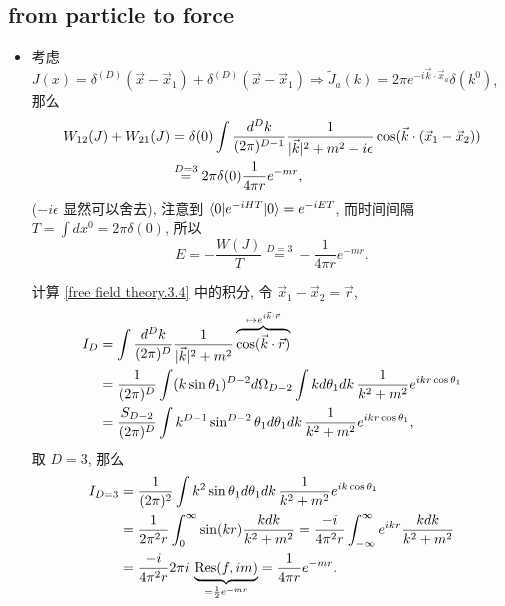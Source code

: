 \subsection{from particle to force}
\begin{itemize}
	\item 考虑 $J(x) = \delta^{(D)}(\vec{x} - \vec{x}_1) + \delta^{(D)}(\vec{x} - \vec{x}_1) \Longrightarrow \tilde{J}_a(k) = 2 \pi e^{- i \vec{k} \cdot \vec{x}_a} \delta(k^0)$, 那么
	\begin{align}
		W_{1 2}(J) + W_{2 1}(J) &= \delta(0) \int \frac{d^D k}{(2 \pi)^{D - 1}} \frac{1}{|\vec{k}|^2 + m^2 - i \epsilon} \cos(\vec{k} \cdot (\vec{x}_1 - \vec{x}_2)) \notag \\
		&\overset{D = 3}{=} 2 \pi \delta(0) \frac{1}{4 \pi r} e^{- m r}, \label{free field theory.3.4}
	\end{align}
	($- i \epsilon$ 显然可以舍去), 注意到 $\braket{0 | e^{- i H T} | 0} = e^{- i E T}$, 而时间间隔 $T = \int dx^0 = 2 \pi \delta(0)$, 所以
	\begin{equation}
		E = - \frac{W(J)}{T} \overset{D = 3}{=} - \frac{1}{4 \pi r} e^{- m r}.
	\end{equation}
	
	\begin{tcolorbox}[title=calculation:]
		计算 \eqref{free field theory.3.4} 中的积分, 令 $\vec{x}_1 - \vec{x}_2 = \vec{r}$,
		\begin{align}
			I_D &= \int \frac{d^D k}{(2 \pi)^D} \frac{1}{|\vec{k}|^2 + m^2} \overbrace{\cos(\vec{k} \cdot \vec{r})}^{\mapsto e^{i \vec{k} \cdot \vec{r}}} \notag \\
			&= \frac{1}{(2 \pi)^D} \int (k \sin \theta_1)^{D - 2} d\Omega_{D - 2} \int k d\theta_1 dk \, \frac{1}{k^2 + m^2} e^{i k r \cos \theta_1} \notag \\
			&= \frac{S_{D - 2}}{(2 \pi)^D} \int k^{D - 1} \sin^{D - 2} \theta_1 d\theta_1 dk \, \frac{1}{k^2 + m^2} e^{i k r \cos \theta_1},
		\end{align}
		取 $D = 3$, 那么
		\begin{align}
			I_{D = 3} &= \frac{1}{(2 \pi)^2} \int k^2 \sin \theta_1 d\theta_1 dk \, \frac{1}{k^2 + m^2} e^{i k \cos \theta_1} \notag \\
			&= \frac{1}{2 \pi^2 r} \int_0^\infty \sin(k r) \frac{k dk}{k^2 + m^2} = \frac{- i}{4 \pi^2 r} \int_{- \infty}^\infty e^{i k r} \frac{k dk}{k^2 + m^2} \notag \\
			&= \frac{- i}{4 \pi^2 r} 2 \pi i \, \underbrace{\mathrm{Res}(f, i m)}_{= \frac{1}{2} e^{- m r}} = \frac{1}{4 \pi r} e^{- m r}.
		\end{align}
	\end{tcolorbox}
\end{itemize}

